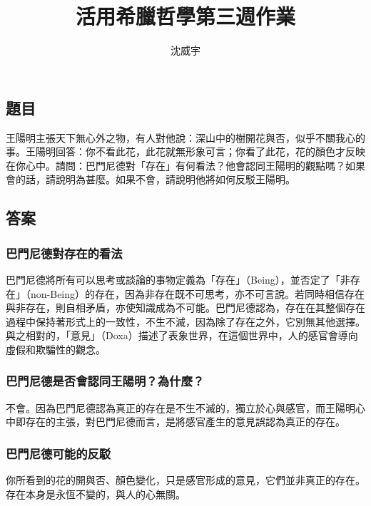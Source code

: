 \documentclass[a4paper,12pt]{article}
\begin{document}
\title{活用希臘哲學第三週作業}
\author{沈威宇}
\date{\temtoday}
\temdoc
\subsection{題目}
王陽明主張天下無心外之物，有人對他說：深山中的樹開花與否，似乎不關我心的事。王陽明回答：你不看此花，此花就無形象可言；你看了此花，花的顏色才反映在你心中。請問：巴門尼德對「存在」有何看法？他會認同王陽明的觀點嗎？如果會的話，請說明為甚麼。如果不會，請說明他將如何反駁王陽明。
\subsection{答案}
\subsubsection{巴門尼德對存在的看法}
巴門尼德將所有可以思考或談論的事物定義為「存在」（Being），並否定了「非存在」（non-Being）的存在，因為非存在既不可思考，亦不可言說。若同時相信存在與非存在，則自相矛盾，亦使知識成為不可能。巴門尼德認為，存在在其整個存在過程中保持著形式上的一致性，不生不滅，因為除了存在之外，它別無其他選擇。與之相對的，「意見」（Doxa）描述了表象世界，在這個世界中，人的感官會導向虛假和欺騙性的觀念。 
\subsubsection{巴門尼德是否會認同王陽明？為什麼？}
不會。因為巴門尼德認為真正的存在是不生不滅的，獨立於心與感官，而王陽明心中即存在的主張，對巴門尼德而言，是將感官產生的意見誤認為真正的存在。
\subsubsection{巴門尼德可能的反駁}
你所看到的花的開與否、顏色變化，只是感官形成的意見，它們並非真正的存在。存在本身是永恆不變的，與人的心無關。
\end{document}
